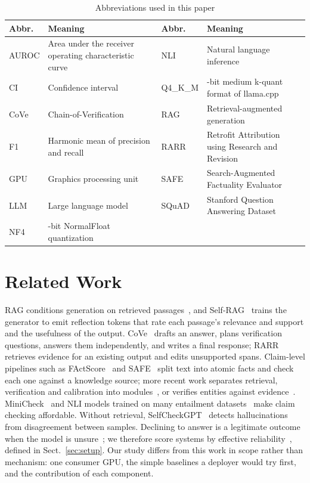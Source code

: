\documentclass{svproc}
\begin{document}
\begin{table}[htb]
\caption{Abbreviations used in this paper}
\label{tab:abbr}
\centering
\footnotesize
\setlength{\tabcolsep}{3pt}
\begin{tabular}{@{}l>{\raggedright\arraybackslash}p{4.55cm}l>{\raggedright\arraybackslash}p{4.55cm}@{}}
\toprule
Abbr. & Meaning & Abbr. & Meaning \\
\midrule
AUROC & Area under the receiver operating characteristic curve & NLI & Natural language inference \\
CI & Confidence interval & Q4\_K\_M & 4-bit medium k-quant format of llama.cpp \\
CoVe & Chain-of-Verification & RAG & Retrieval-augmented generation \\
F1 & Harmonic mean of precision and recall & RARR & Retrofit Attribution using Research and Revision \\
GPU & Graphics processing unit & SAFE & Search-Augmented Factuality Evaluator \\
LLM & Large language model & SQuAD & Stanford Question Answering Dataset \\
NF4 & 4-bit NormalFloat quantization & & \\
\bottomrule
\end{tabular}
\end{table}

\section{Related Work}
RAG conditions generation on retrieved passages~\cite{lewis2020rag}, and Self-RAG~\cite{asai2023selfrag} trains the generator to emit reflection tokens that rate each passage's relevance and support and the usefulness of the output. CoVe~\cite{dhuliawala2023cove} drafts an answer, plans verification questions, answers them independently, and writes a final response; RARR~\cite{gao2022rarr} retrieves evidence for an existing output and edits unsupported spans. Claim-level pipelines such as FActScore~\cite{min2023factscore} and SAFE~\cite{wei2024safe} split text into atomic facts and check each one against a knowledge source; more recent work separates retrieval, verification and calibration into modules~\cite{r2vc2026}, or verifies entities against evidence~\cite{jia2026entity}. MiniCheck~\cite{tang2024minicheck} and NLI models trained on many entailment datasets~\cite{laurer2023nli} make claim checking affordable. Without retrieval, SelfCheckGPT~\cite{manakul2023selfcheckgpt} detects hallucinations from disagreement between samples. Declining to answer is a legitimate outcome when the model is unsure~\cite{wen2024abstention}; we therefore score systems by effective reliability~\cite{whitehead2022reliable}, defined in Sect.~\ref{sec:setup}. Our study differs from this work in scope rather than mechanism: one consumer GPU, the simple baselines a deployer would try first, and the contribution of each component.
\end{document}
